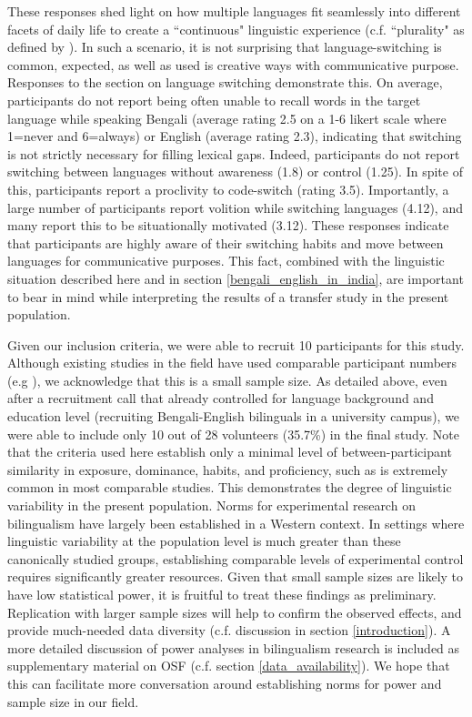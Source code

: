 \documentclass[12 pt]{article}
\begin{document}
These responses shed light on how multiple languages fit seamlessly into different facets of daily life to create a ``continuous" linguistic experience (c.f. ``plurality" as defined by \cite{khubchandani2021plural}). In such a scenario, it is not surprising that language-switching is common, expected, as well as used is creative ways with communicative purpose. Responses to the section on language switching demonstrate this. On average, participants do not report being often unable to recall words in the target language while speaking Bengali (average rating 2.5 on a 1-6 likert scale where 1=never and 6=always) or English (average rating 2.3), indicating that switching is not strictly necessary for filling lexical gaps. Indeed, participants do not report switching between languages without awareness (1.8) or control (1.25). In spite of this, participants report a proclivity to code-switch (rating 3.5). Importantly, a large number of participants report volition while switching languages (4.12), and many report this to be situationally motivated (3.12). These responses indicate that participants are highly aware of their switching habits and move between languages for communicative purposes. This fact, combined with the linguistic situation described here and in section \ref{bengali_english_in_india}, are important to bear in mind while interpreting the results of a transfer study in the present population. 

Given our inclusion criteria, we were able to recruit 10 participants for this study. Although existing studies in the field have used comparable participant numbers (e.g ), we acknowledge that this is a small sample size. As detailed above, even after a recruitment call that already controlled for language background and education level (recruiting Bengali-English bilinguals in a university campus), we were able to include only 10 out of 28 volunteers (35.7\%) in the final study. Note that the criteria used here establish only a minimal level of between-participant similarity in exposure, dominance, habits, and proficiency, such as is extremely common in most comparable studies. This demonstrates the degree of linguistic variability in the present population. Norms for experimental research on bilingualism have largely been established in a Western context. In settings where linguistic variability at the population level is much greater than these canonically studied groups, establishing comparable levels of experimental control requires significantly greater resources. Given that small sample sizes are likely to have low statistical power, it is fruitful to treat these findings as preliminary. Replication with larger sample sizes will help to confirm the observed effects, and provide much-needed data diversity (c.f. discussion in section \ref{introduction}). A more detailed discussion of power analyses in bilingualism research is included as supplementary material on OSF (c.f. section \ref{data_availability}). We hope that this can facilitate more conversation around establishing norms for power and sample size in our field.  
\end{document}
